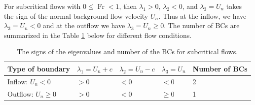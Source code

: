 \documentclass{article}
\numberwithin{equation}{section}
\theoremstyle{definition}
\begin{document}
For subcritical flows with $0\le \operatorname{Fr} <1$, then $\lambda_1>0$, $\lambda_2 <0$, and $\lambda_3 = U_n$ takes the sign of the normal background  flow velocity $U_n$. Thus at the inflow, we have $\lambda_3 = U_n <0$ and at the outflow we have $\lambda_3 = U_n \ge 0$. The number of BCs  are summarized in the Table \ref{tab:num_bound} below for different flow conditions.
\begin{table}[htb!]
\centering
\begin{tabular}{ | m{7.75em}| m{5em} | m{5em}| m{4em}| m{7em}|} 
  \hline
                   Type of boundary                 & $\lambda_1=U_n+c$ & $\lambda_2=U_n-c$ & $\lambda_3=U_n$ &Number of BCs\\ 
  \hline
   Inflow: $U_n <0$ & $>0$ & $<0$ & $<0$ & 2 \\ 
  \hline
   Outflow: $U_n \ge 0$ & $>0$ & $<0$ & $\ge 0$ & 1 \\  
  \hline
\end{tabular}
\caption{The signs of the eigenvalues and number of the BCs for subcritical flows.}
\label{tab:num_bound}
\end{table}
\end{document}
